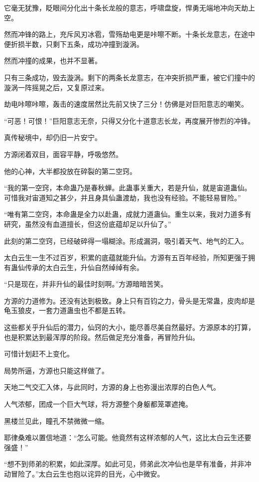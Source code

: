 \begin{this_body}
它毫无犹豫，眨眼间分化出十条长龙般的意志，呼啸盘旋，悍勇无端地冲向天劫上空。

然而冲锋的路上，充斥风刃冰雹，雪殇劫电更是咔嚓不断。十条长龙意志，在途中便折损半数，只剩下五条，成功冲撞到漩涡。

然而冲撞的成果，也并不显著。

只有三条成功，毁去漩涡。剩下的两条长龙意志，在冲突折损严重，被它们撞中的漩涡一阵摇晃之后，又复原过来。

劫电咔嚓咔嚓，轰击的速度居然比先前又快了三分！仿佛是对巨阳意志的嘲笑。

“可恶！可恨！”巨阳意志无奈，只得又分化十道意志长龙，再度展开惨烈的冲锋。

真传秘境中，却仍旧一片安宁。

方源闭着双目，面容平静，呼吸悠然。

他的心神，大半都投放在碎裂的第二空窍。

“我的第一空窍，本命蛊乃是春秋蝉。此蛊事关重大，若是升仙，就是宙道蛊仙。可惜我对宙道知之甚少，并且身具仙蛊渡劫，我也没有经验。不能轻易冒险。”

“唯有第二空窍，本命蛊是全力以赴蛊，成就力道蛊仙。重生以来，我对力道多有研究，虽然没有血道擅长，但这份底蕴却足以升仙了。”

此刻的第二空窍，已经破碎得一塌糊涂。形成漏洞，吸引着天气、地气的汇入。

太白云生一生不过百岁，积累的底蕴就能升仙。方源有五百年经验，所知更强于拥有蛊仙传承的太白云生，升仙自然绰绰有余。

“只是现在，并非升仙的最佳时刻啊。”方源暗暗苦笑。

方源的力道修为。还没有达到极致。身上只有百钧之力，骨头是无常蛊，皮肉却是龟玉狼皮，一套力道蛊虫也不都是五转。

这些都关乎升仙后的潜力，仙窍的大小，能尽善尽美自然最好。方源原本的打算，也是积累达到最浑厚的阶段。然后做足充分准备，再冒险升仙。

可惜计划赶不上变化。

局势所逼，方源也只能这样做了。

天地二气交汇入体，与此同时，方源的身上也弥漫出浓厚的白色人气。

人气浓郁，团成一个巨大气球，将方源整个身躯都笼罩遮掩。

黑楼兰见此，瞳孔不禁微微一缩。

耶律桑难以置信地道：“怎么可能。他竟然有这样浓郁的人气，这比太白云生还要强盛！”

“想不到师弟的积累，如此深厚。如此可见，师弟此次冲仙也是早有准备，并非冲动冒险了。”太白云生也抱以诧异的目光，心中微安。


\end{this_body}
